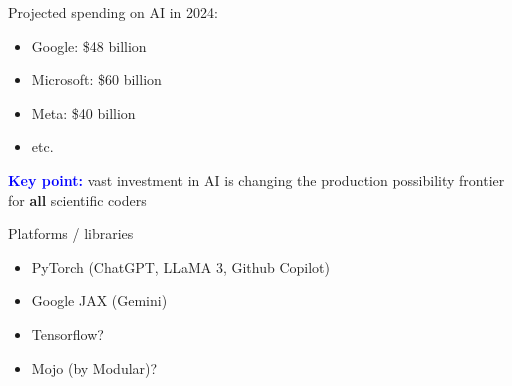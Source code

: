 \documentclass[
    xcolor={svgnames,dvipsnames},
    hyperref={colorlinks, citecolor=DeepPink4, linkcolor=DarkRed, urlcolor=DarkBlue}
    ]{beamer}  %
\newcommand{\navy}[1]{\textcolor{Blue}{\bf #1}}
\newcommand{\emp}[1]{\textcolor{DarkOrange1}{\bf #1}}
\newcommand{\1}{\mathbbm 1}
\begin{document}
\begin{frame}
    
    Projected spending on AI in 2024:

    \begin{itemize}
        \item Google: \$48 billion
        \vspace{0.5em}
        \item Microsoft: \$60 billion
        \vspace{0.5em}
        \item Meta: \$40 billion
        \vspace{0.5em}
        \item etc.
    \end{itemize}

    \pause
        \vspace{0.5em}
        \vspace{0.5em}
        \vspace{0.5em}
        \vspace{0.5em}
        \navy{Key point:} vast investment in AI is changing the production
        possibility frontier for \emp{all} scientific coders

\end{frame}


\begin{frame}
    

    Platforms / libraries

    \begin{itemize}
        \item PyTorch (ChatGPT, LLaMA 3, Github Copilot)
        \vspace{0.5em}
        \item Google JAX (Gemini)
        \vspace{0.5em}
        \item Tensorflow? 
        \vspace{0.5em}
        \item Mojo (by Modular)?
    \end{itemize}

\end{frame}
\end{document}
